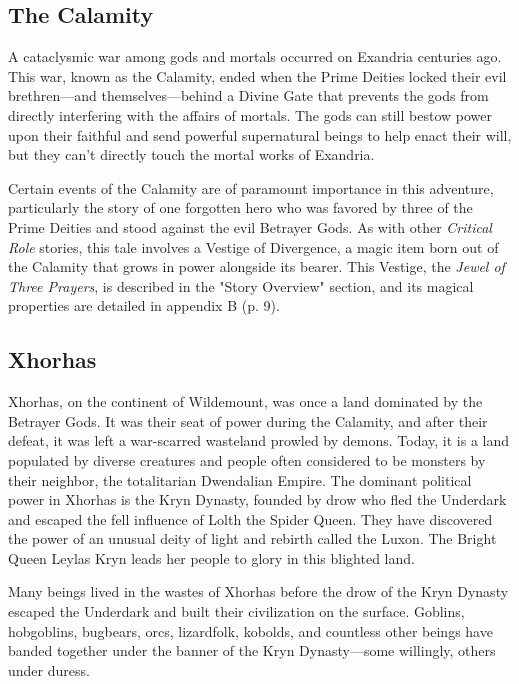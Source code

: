 \documentclass[a4paper, 11pt, bg=full, twocolumn, nooutline]{dndbook}
\begin{document}
\subsection{The Calamity}

A cataclysmic war among gods and mortals occurred on Exandria centuries ago. This war, known as the Calamity, ended when the Prime Deities locked their evil brethren---and themselves---behind a Divine Gate that prevents the gods from directly interfering with the affairs of mortals. The gods can still bestow power upon their faithful and send powerful supernatural beings to help enact their will, but they can't directly touch the mortal works of Exandria.

Certain events of the Calamity are of paramount importance in this adventure, particularly the story of one forgotten hero who was favored by three of the Prime Deities and stood against the evil Betrayer Gods. As with other \textit{Critical Role} stories, this tale involves a Vestige of Divergence, a magic item born out of the Calamity that grows in power alongside its bearer. This Vestige, the \textit{Jewel of Three Prayers}, is described in the "Story Overview" section, and its magical properties are detailed in appendix B (p. 9).

\subsection{Xhorhas}

Xhorhas, on the continent of Wildemount, was once a land dominated by the Betrayer Gods. It was their seat of power during the Calamity, and after their defeat, it was left a war-scarred wasteland prowled by demons. Today, it is a land populated by diverse creatures and people often considered to be monsters by their neighbor, the totalitarian Dwendalian Empire. The dominant political power in Xhorhas is the Kryn Dynasty, founded by drow who fled the Underdark and escaped the fell influence of Lolth the Spider Queen. They have discovered the power of an unusual deity of light and rebirth called the Luxon. The Bright Queen Leylas Kryn leads her people to glory in this blighted land.

Many beings lived in the wastes of Xhorhas before the drow of the Kryn Dynasty escaped the Underdark and built their civilization on the surface. Goblins, hobgoblins, bugbears, orcs, lizardfolk, kobolds, and countless other beings have banded together under the banner of the Kryn Dynasty---some willingly, others under duress.
\end{document}
